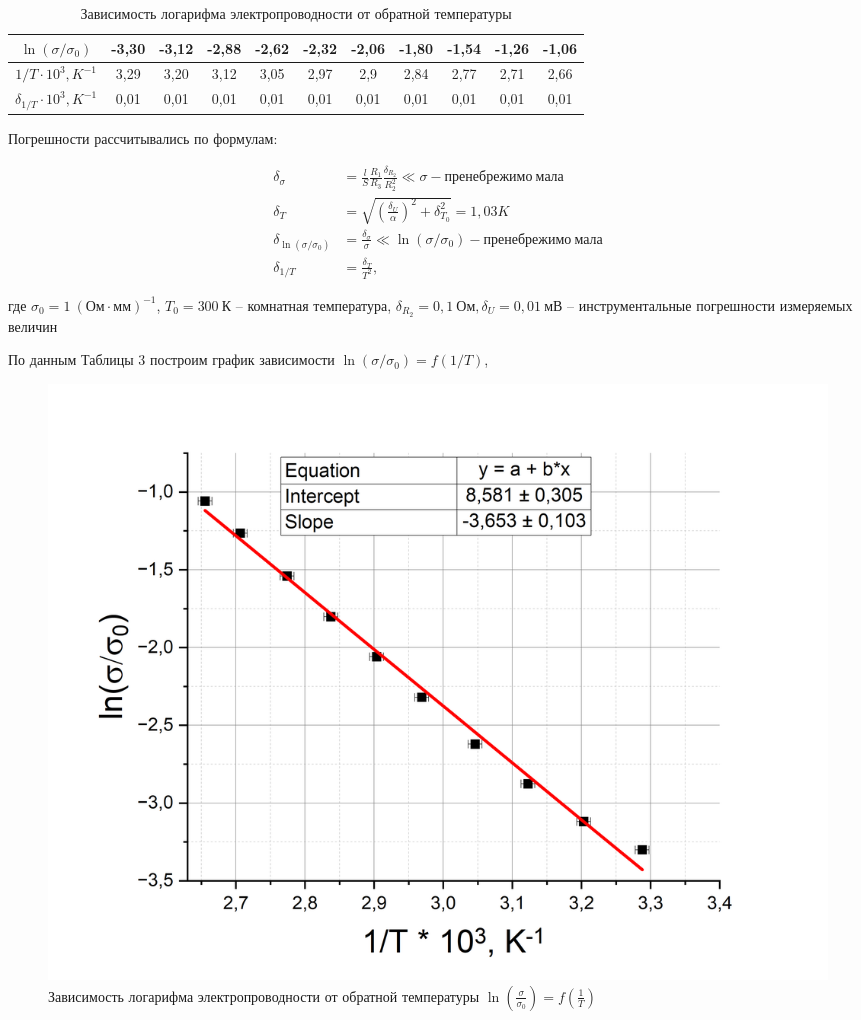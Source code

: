 \documentclass[a4paper,12pt]{article}
\begin{document}
\begin{table}[h!]
\centering
\caption{Зависимость логарифма электропроводности от обратной температуры}
\begin{tabular}{|c|c|c|c|c|c|c|c|c|c|c|}
\hline
$\ln(\sigma / \sigma_0)$ & -3,30 & -3,12 & -2,88 & -2,62 & -2,32 & -2,06 & -1,80 & -1,54 & -1,26 & -1,06 \\ \hline
$1/T \cdot 10^3, K^{-1}$ & 3,29 & 3,20 & 3,12 & 3,05 & 2,97 & 2,9 & 2,84 & 2,77 & 2,71 & 2,66 \\ \hline
$\delta_{1/T} \cdot 10^3, K^{-1}$ & 0,01 & 0,01 & 0,01 & 0,01 & 0,01 & 0,01 & 0,01 & 0,01 & 0,01 & 0,01 \\ \hline
\end{tabular}
\end{table}

Погрешности рассчитывались по формулам:

\begin{align*}
	\delta_{\sigma} &= \frac{l}{S} \frac{R_1}{R_3} \frac{\delta_{R_2}}{R_2^2}  \ll \sigma - пренебрежимо \ мала\\
	\delta_T &= \sqrt{ \left( \frac{\delta_U}{\alpha} \right)^2 + \delta_{T_0}^2} = 1,03 K \\
	\delta_{\ln(\sigma / \sigma_0)} &= \frac{ \delta_{\sigma}}{\sigma} \ll \ln(\sigma / \sigma_0) - пренебрежимо \ мала \\
	\delta_{1/T} &= \frac{\delta_T}{T^2},
\end{align*}

где $\sigma_0 = 1 \ (Ом \cdot мм)^{-1}$, $T_0 = 300 \ К$ -- комнатная температура, $\delta_{R_2} = 0,1 \ Ом, \delta_U = 0,01 \ мВ$ -- инструментальные погрешности измеряемых величин 

\pagebreak

По данным Таблицы 3 построим график зависимости $\ln (\sigma / \sigma_0) = f(1/T)$,

\begin{figure}[h!]
	\centering
	\includegraphics[width=0.8\linewidth]{linear_sigma(T)}
	\caption{Зависимость логарифма электропроводности от обратной температуры  \linebreak $\ln \left(\frac{\sigma}{\sigma_0}\right) = f \left(\frac{1}{T} \right)$}
\end{figure}
\end{document}
